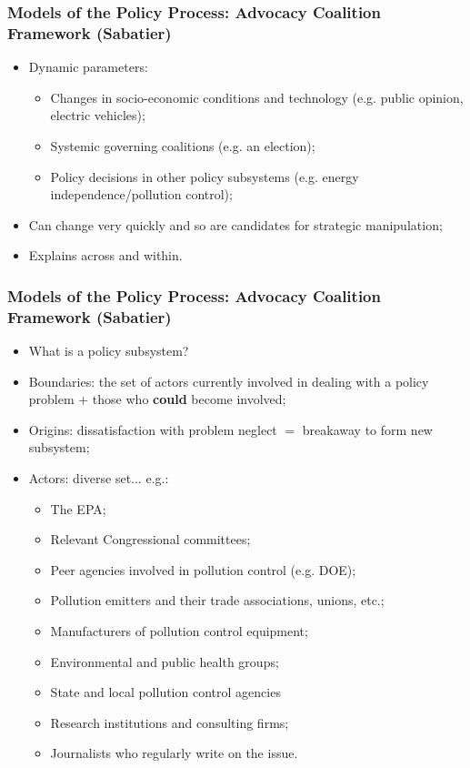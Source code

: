 \documentclass[aspectratio=169]{beamer}
\theoremstyle{principle}
\begin{document}
\begin{frame}
\frametitle{Models of the Policy Process: Advocacy Coalition Framework (Sabatier)}

\begin{itemize}
\item Dynamic parameters:
\bigskip
\begin{itemize}
\item Changes in socio-economic conditions and technology (e.g. public opinion, electric vehicles);
\bigskip
\item Systemic governing coalitions (e.g. an election);
\bigskip
\item Policy decisions in other policy subsystems (e.g. energy independence/pollution control);
\end{itemize}
\bigskip
\item Can change very quickly and so are candidates for strategic manipulation;
\bigskip
\item Explains across and within.
\end{itemize}

\end{frame}

\begin{frame}
\frametitle{Models of the Policy Process: Advocacy Coalition Framework (Sabatier)}

\begin{itemize}
\item What is a policy subsystem?
\bigskip
\item Boundaries: the set of actors currently involved in dealing with a policy problem $+$ those who \textbf{could} become involved;
\bigskip
\item Origins: dissatisfaction with problem neglect $=$ breakaway to form new subsystem;
\bigskip
\item Actors: diverse set... e.g.:
\begin{itemize}
\item The EPA;
\item Relevant Congressional committees;
\item Peer agencies involved in pollution control (e.g. DOE);
\item Pollution emitters and their trade associations, unions, etc.;
\item Manufacturers of pollution control equipment;
\item Environmental and public health groups;
\item State and local pollution control agencies
\item Research institutions and consulting firms;
\item Journalists who regularly write on the issue.
\end{itemize}
\end{itemize}

\end{frame}
\end{document}
